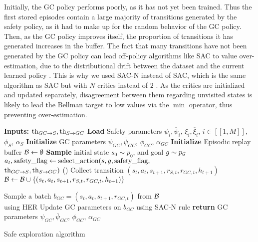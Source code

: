 Initially, the GC policy performs poorly, as it has not yet been trained.
Thus the first stored episodes contain a large majority of transitions generated by the safety policy, as it had to
make up for the random behavior of the GC policy. Then, as the GC policy improves itself, the proportion of transitions 
it has generated increases in the buffer. The fact that many transitions have not been generated by the GC policy can 
lead off-policy algorithms like SAC to value over-estimation, due to the distributional drift between the dataset 
and the current learned policy \cite{levine2020offline}. This is why we used SAC-N instead of SAC, which is the 
same algorithm as SAC but with $N$ critics instead of $2$ \cite{sac_n_edac}. As the critics are initialized and updated
separately, disagreement between them regarding unvisited states is likely to lead the Bellman target to low values via the 
$\min$ operator, thus preventing over-estimation. 

\begin{algorithm}[H]
\begin{algorithmic}[1]
\STATE \textbf{Inputs:} $\text{th}_{GC \rightarrow S}, \text{th}_{S \rightarrow GC}$ 
\STATE \textbf{Load} Safety parameters $\psi_i, \overline{\psi}_i$, $\xi_i, \overline{\xi}_i$, $i\in[\![1, M]\!]$, $\phi_S$, $\alpha_S$
\STATE \textbf{Initialize} GC parameters $\psi_{GC}, \overline{\psi}_{GC}$, $\phi_{GC}$, $\alpha_{GC}$
\STATE \textbf{Initialize} Episodic replay buffer $\mathcal{B} \leftarrow \emptyset$
\STATE \textbf{Sample} initial state $s_0 \sim p_0$, and goal $g \sim p_{\mathcal{G}}$ 
\STATE $a_t, \text{safety}\_\text{flag} \leftarrow \text{select\_action}(s, g, \text{safety}\_\text{flag},$ \\$ \text{th}_{GC \rightarrow S}, \text{th}_{S \rightarrow GC})$
()
\STATE Collect transition $(s_t, a_t, s_{t+1}, r_{S, t}, r_{GC, t}, h_{t+1})$
\STATE $\mathcal{B} \leftarrow \mathcal{B} \cup \{ (s_t, a_t, s_{t+1}, r_{S, t}, r_{GC, t}, h_{t+1}) \}$
\ENDFOR 
{}

\STATE Sample a batch $b_{GC} = (s_t, a_t, s_{t+1}, r_{GC, t})$ from $\mathcal{B}$ \\ using HER \cite{HER}
\STATE Update GC parameters on $b_{GC}$ using SAC-N rule \cite{SACN_edac}
\ENDFOR
\ENDFOR
\STATE \textbf{return} GC parameters $\psi_{GC}, \overline{\psi}_{GC}$, $\phi_{GC}$, $\alpha_{GC}$ %
\end{algorithmic}
\caption{Safe exploration algorithm}
\label{alg:main_algorithm}
\end{algorithm}
